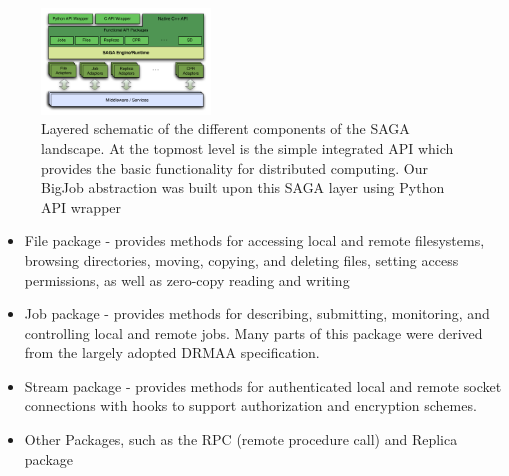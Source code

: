 \documentclass[conference,final]{IEEEtran}
\newcommand{\skonote}[1]{ {\textcolor{blue} { ***Jeff: #1 }}}
\newcommand{\skonote}[1]{}
\begin{document}
\begin{figure}[!ht]
 \begin{center}
     \includegraphics[width=0.40\textwidth]{stci_saga_figures-1.pdf}
 \end{center}
\caption{\small Layered schematic of the different components
  of the SAGA landscape. At the topmost level is the simple integrated API which provides the basic functionality for distributed computing. Our BigJob abstraction was built upon this SAGA layer using Python API wrapper} \label{Fig:SAGA1}
\end{figure}



\begin{itemize}
\item File package - provides methods for accessing local and remote
 filesystems, browsing directories, moving, copying, and deleting
 files, setting access permissions, as well as zero-copy reading and
 writing
\item Job package - provides methods for describing, submitting,
 monitoring, and controlling local and remote jobs. Many parts of
 this package were derived from the largely adopted
 DRMAA %
 specification.
\item Stream package - provides methods for authenticated local and
 remote socket connections with hooks to support authorization and
 encryption schemes.
\item Other Packages, such as the RPC (remote procedure call) and Replica
 package
\end{itemize}





\end{document}

